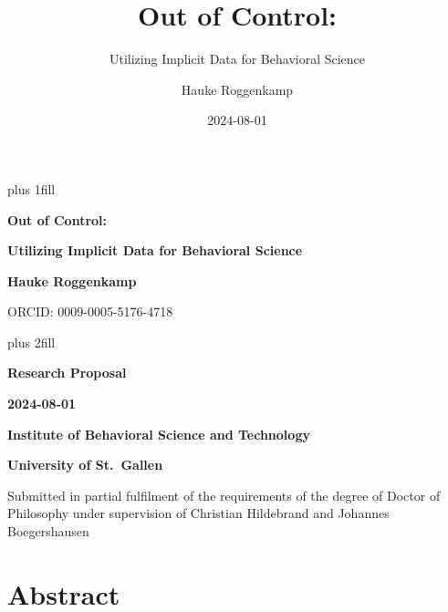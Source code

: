 \documentclass[
  a4paper,
]{scrreprt}
\title{Out of Control:}
\subtitle{Utilizing Implicit Data for Behavioral Science}
\author{Hauke Roggenkamp}
\date{2024-08-01}
\renewcommand*\contentsname{Table of contents}
\newcommand\contentsname{Table of contents}
\begin{document}
\cleardoublepage
\thispagestyle{empty}
{\centering
\hbox{}\vskip 0cm plus 1fill
{\Huge\bfseries Out of Control: \par}
\vspace{3ex}
{\Large\bfseries Utilizing Implicit Data for Behavioral Science \par}
\vspace{12ex}
{\Large\bfseries Hauke Roggenkamp \par}
\vspace{3ex}
{\Large ORCID: 0009-0005-5176-4718 \par}
\vskip 0cm plus 2fill
{\bfseries\large Research Proposal \par}
\vspace{3ex}
{\bfseries\large 2024-08-01 \par}
\vspace{12ex}
%
%
{\bfseries\large Institute of Behavioral Science and Technology \par}
\vspace{3ex}
%
{\bfseries\large University of St.~Gallen \par}
%
\vspace{12ex}
{\small Submitted in partial fulfilment of the requirements
of the degree of Doctor of Philosophy under supervision of Christian Hildebrand and Johannes Boegershausen\par}
}
\ifdefined\Shaded\renewenvironment{Shaded}{\begin{tcolorbox}[borderline west={3pt}{0pt}{shadecolor}, interior hidden, frame hidden, breakable, enhanced, boxrule=0pt, sharp corners]}{\end{tcolorbox}}\fi

\renewcommand*\contentsname{Table of contents}
{
\hypersetup{linkcolor=}
\setcounter{tocdepth}{2}
\tableofcontents
}

\hypertarget{abstract}{%
\chapter*{Abstract}\label{abstract}}

\end{document}
